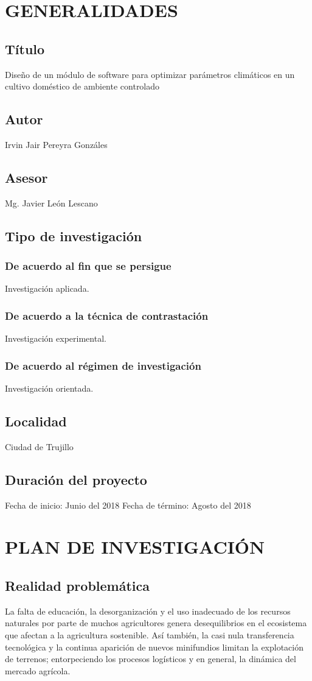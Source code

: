 \documentclass{report}
\date{\today}
\begin{document}
\tableofcontents
{}

\chapter{GENERALIDADES}
\section{Título}
Diseño de un módulo de software para optimizar parámetros climáticos en un
cultivo doméstico de ambiente controlado
\section{Autor}
Irvin Jair Pereyra Gonzáles
\section{Asesor}
Mg. Javier León Lescano
\section{Tipo de investigación}
\subsection{De acuerdo al fin que se persigue}
  Investigación aplicada.
\subsection{De acuerdo a la técnica de contrastación}
  Investigación experimental.
\subsection{De acuerdo al régimen de investigación}
  Investigación orientada.
\section{Localidad}
Ciudad de Trujillo
\section{Duración del proyecto}
Fecha de inicio: Junio del 2018
Fecha de término: Agosto del 2018
\chapter{PLAN DE INVESTIGACIÓN}
\section{Realidad problemática}
La falta de educación, la desorganización y el uso inadecuado de los recursos
naturales por parte de muchos agricultores genera desequilibrios en el
ecosistema que afectan a la agricultura sostenible. Así también, la casi nula
transferencia tecnológica y la continua aparición de nuevos minifundios limitan
la explotación de terrenos; entorpeciendo los procesos logísticos y en general,
la dinámica del mercado agrícola.
\end{document}
